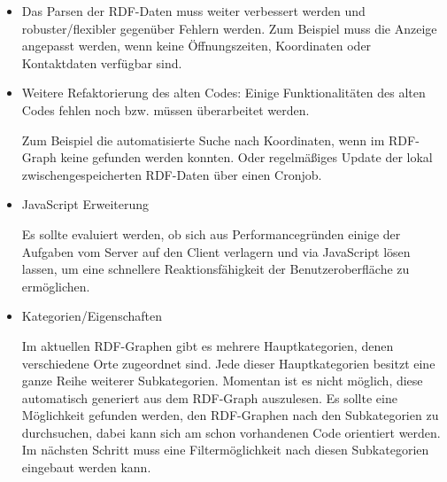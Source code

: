 \documentclass[11pt,a4paper]{article}
\begin{document}
\begin{itemize}
\item Das Parsen der RDF-Daten muss weiter verbessert werden und
  robuster/flexibler gegenüber Fehlern werden. Zum Beispiel muss die Anzeige
  angepasst werden, wenn keine Öffnungszeiten, Koordinaten oder Kontaktdaten
  verfügbar sind.
\item Weitere Refaktorierung des alten Codes: Einige Funktionalitäten des alten
  Codes fehlen noch bzw. müssen überarbeitet werden. 

  Zum Beispiel die automatisierte Suche nach Koordinaten, wenn im RDF-Graph
  keine gefunden werden konnten. Oder regelmäßiges Update der lokal
  zwischengespeicherten RDF-Daten über einen Cronjob.
\item JavaScript Erweiterung

  Es sollte evaluiert werden, ob sich aus Performancegründen einige der
  Aufgaben vom Server auf den Client verlagern und via JavaScript lösen lassen,
  um eine schnellere Reaktionsfähigkeit der Benutzeroberfläche zu ermöglichen.
\item Kategorien/Eigenschaften

  Im aktuellen RDF-Graphen gibt es mehrere Hauptkategorien, denen verschiedene
  Orte zugeordnet sind. Jede dieser Hauptkategorien besitzt eine ganze Reihe
  weiterer Subkategorien. Momentan ist es nicht möglich, diese automatisch
  generiert aus dem RDF-Graph auszulesen. Es sollte eine Möglichkeit gefunden
  werden, den RDF-Graphen nach den Subkategorien zu durchsuchen, dabei kann
  sich am schon vorhandenen Code orientiert werden. Im nächsten Schritt muss
  eine Filtermöglichkeit nach diesen Subkategorien eingebaut werden kann.
\end{itemize}
\end{document}
